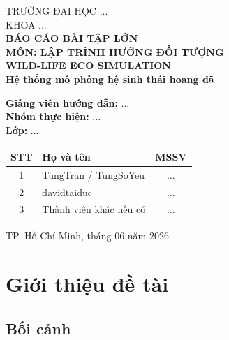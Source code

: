 \documentclass[12pt,a4paper]{article}
\begin{document}
\begin{titlepage}
    \centering

    {\Large TRƯỜNG ĐẠI HỌC ...}\\
    {\Large KHOA ...}\\[2cm]

    {\LARGE \textbf{BÁO CÁO BÀI TẬP LỚN}}\\[0.5cm]
    {\Large \textbf{MÔN: LẬP TRÌNH HƯỚNG ĐỐI TƯỢNG}}\\[1.5cm]

    {\Huge \textbf{WILD-LIFE ECO SIMULATION}}\\[0.5cm]
    {\Large \textbf{Hệ thống mô phỏng hệ sinh thái hoang dã}}\\[2cm]

    \begin{flushleft}
        \textbf{Giảng viên hướng dẫn:} ...\\
        \textbf{Nhóm thực hiện:} ...\\
        \textbf{Lớp:} ...\\
    \end{flushleft}

    \vspace{1cm}

    \begin{tabular}{|c|l|c|}
        \hline
        \textbf{STT} & \textbf{Họ và tên} & \textbf{MSSV} \\
        \hline
        1 & TungTran / TungSoYeu & ... \\
        \hline
        2 & davidtaiduc & ... \\
        \hline
        3 & Thành viên khác nếu có & ... \\
        \hline
    \end{tabular}

    \vfill
    {\large TP. Hồ Chí Minh, tháng 06 năm 2026}
\end{titlepage}

\tableofcontents
\newpage


\section{Giới thiệu đề tài}

\subsection{Bối cảnh}
\end{document}
